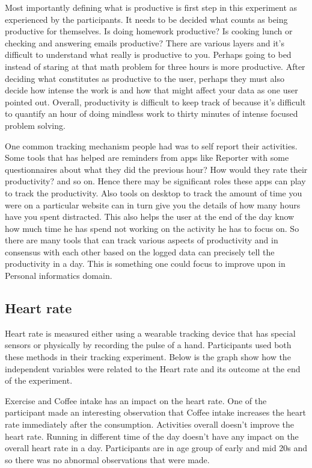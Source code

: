 Most importantly defining what is productive is first step in this experiment as experienced by the participants. It needs to be decided what counts as being productive for themselves. Is doing homework productive? Is cooking lunch or checking and answering emails productive? There are various layers and it’s difficult to understand what really is productive to you. Perhaps going to bed instead of staring at that math problem for three hours is more productive. After deciding what constitutes as productive to the user, perhaps they must also decide how intense the work is and how that might affect your data as one user pointed out. Overall, productivity is difficult to keep track of because it’s difficult to quantify an hour of doing mindless work to thirty minutes of intense focused problem solving. 

One common tracking mechanism people had was to self report their activities. Some tools that has helped are reminders from apps like Reporter with some questionnaires about what they did the previous hour? How would they rate their productivity? and so on. Hence there may be significant roles these apps can play to track the productivity. Also tools on desktop to track the amount of time you were on a particular website can in turn give you the details of how many hours have you spent distracted. This also helps the user at the end of the day know how much time he has spend not working on the activity he has to focus on. So there are many tools that can track various aspects of productivity and in consensus with each other based on the logged data can precisely tell the productivity in a day. This is something one could focus to improve upon in Personal informatics domain.

\subsection{Heart rate}
Heart rate is measured either using a wearable tracking device that has special sensors or physically by recording the pulse of a hand. Participants used both these methods in their tracking experiment. 
Below is the graph show how the independent variables were related to the Heart rate and its outcome at the end of the experiment.

Exercise and Coffee intake has an impact on the heart rate. One of the participant made an interesting observation that Coffee intake increases the heart rate immediately after the consumption. Activities overall doesn’t improve the heart rate. Running in different time of the day doesn’t have any impact on the overall heart rate in a day. Participants are in age group of early and mid 20s and so there was no abnormal observations that were made. 

